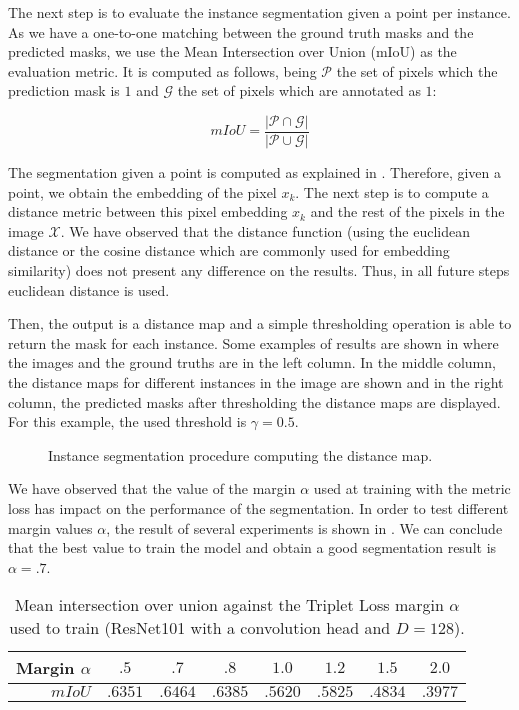 The next step is to evaluate the instance segmentation given a point per instance.
As we have a one-to-one matching between the ground truth masks and the predicted masks, we use the Mean Intersection over Union (mIoU) as the evaluation metric.
It is computed as follows, being $\mathcal{P}$ the set of pixels which the prediction mask is $1$ and $\mathcal{G}$ the set of pixels which are annotated as $1$:

\begin{equation}
  mIoU = \frac{|\mathcal{P} \cap \mathcal{G}|}{|\mathcal{P} \cup \mathcal{G}|}
\end{equation}

The segmentation given a point is computed as explained in .
Therefore, given a point, we obtain the embedding of the pixel $x_k$.
The next step is to compute a distance metric between this pixel embedding $x_k$ and the rest of the pixels in the image $\mathcal{X}$.
We have observed that the distance function (using the euclidean distance or the cosine distance which are commonly used for embedding similarity) does not present any difference on the results.
Thus, in all future steps euclidean distance is used.

Then, the output is a distance map and a simple thresholding operation is able to return the mask for each instance.
Some examples of results are shown in  where the images and the ground truths are in the left column.
In the middle column, the distance maps for different instances in the image are shown and in the right column, the predicted masks after thresholding the distance maps are displayed.
For this example, the used threshold is $\gamma = 0.5$.

\begin{figure}[h]
  \centering
  \caption{Instance segmentation procedure computing the distance map.}
  \label{fig:distance_maps}
\end{figure}

We have observed that the value of the margin $\alpha$ used at training with the metric loss has impact on the performance of the segmentation.
In order to test different margin values $\alpha$, the result of several experiments is shown in .
We can conclude that the best value to train the model and obtain a good segmentation result is $\alpha = .7$.

\begin{table}[h]
  \centering
  \begin{tabular}{r|ccccccc}
    \toprule
    Margin $\alpha$ & $.5$    & $\mathbf{.7}$    & $.8$    & $1.0$   & $1.2$   & $1.5$   & $2.0$   \\
    \midrule
    $mIoU$          & $.6351$ & $\mathbf{.6464}$ & $.6385$ & $.5620$ & $.5825$ & $.4834$ & $.3977$ \\
    \bottomrule
  \end{tabular}
  \caption{Mean intersection over union against the Triplet Loss margin $\alpha$ used to train (ResNet101 with a convolution head and $D=128$). }
  \label{tab:margin_miou}
\end{table}


